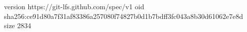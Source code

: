 version https://git-lfs.github.com/spec/v1
oid sha256:ce91d80a7f31af83386a257080f74827b0d1b7bdff3fc043a8b30d61062e7e8d
size 2834
